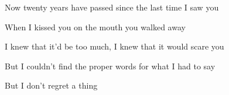\begin{strophe*}
  Now twenty years have passed since the last time I saw you\pause{}

  When I kissed you on the mouth you walked away\pause{}

  I knew that it'd be too much, I knew that it would scare you\pause{}

  But I couldn't find the proper words for what I had to say\pause{}
  
  But I don't regret a thing\PAUSE \chord[c]{[C}\Pause{}\pause\chord[c]{\rep{4}]}
\end{strophe*}